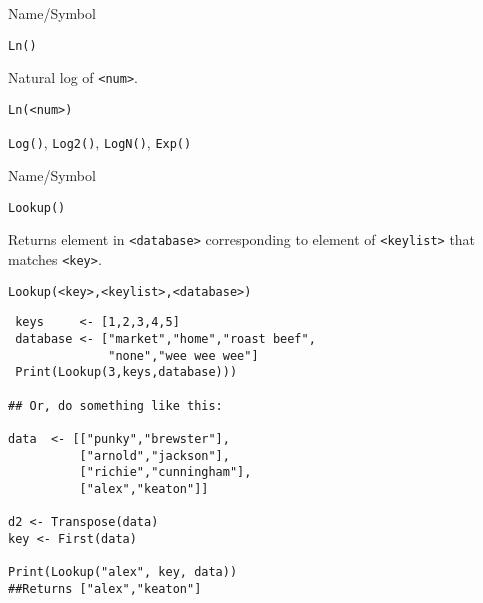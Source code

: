 \begin{desc}{Name/Symbol}
\item[Name/Symbol]	\verb+Ln()+

\item[Description]	Natural log of \verb+<num>+.

\item[Usage]		
\begin{verbatim}
Ln(<num>)
\end{verbatim}

\item[Example]	

\item[See Also]	\verb+Log()+, \verb+Log2()+, \verb+LogN()+, \verb+Exp()+     
\end{desc}





\begin{desc}{Name/Symbol}
\item[Name/Symbol]	\verb+Lookup()+

\item[Description] Returns
element in \verb+<database>+ corresponding to element of
\verb+<keylist>+ that matches \verb+<key>+.

\item[Usage]		
\begin{verbatim}
Lookup(<key>,<keylist>,<database>)
\end{verbatim}

\item[Example]	

\begin{verbatim}
 keys     <- [1,2,3,4,5]
 database <- ["market","home","roast beef",
              "none","wee wee wee"]
 Print(Lookup(3,keys,database))) 

## Or, do something like this:
  
data  <- [["punky","brewster"],
          ["arnold","jackson"],
          ["richie","cunningham"],
          ["alex","keaton"]]

d2 <- Transpose(data)
key <- First(data)

Print(Lookup("alex", key, data))
##Returns ["alex","keaton"]
\end{verbatim}
\item[See Also]	
\end{desc}

